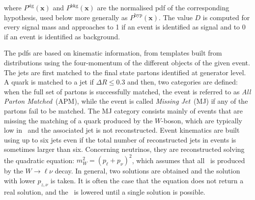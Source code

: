 where $P^{\text{sig}}(\textbf{x})$ and $P^{\text{bkg}}(\textbf{x})$ are the normalised pdf of the corresponding hypothesis, used below more generally as $P^{\text{hyp}}(\textbf{x})$. The value $D$ is computed for every signal mass and approaches to 1 if an event is identified as signal and to 0 if an event is identified as background.

The pdfs are based on kinematic information, from templates built from distributions using the four-momentum of the different objects of the given event. The jets are first matched to the final state partons identified at generator level. A quark is matched to a jet if $\Delta R\leq 0.3$ and then, two categories are defined: when the full set of partons is successfully matched, the event is referred to as \textit{All Parton Matched}~(APM), while the event is called \textit{Missing Jet}~(MJ) if any of the partons fail to be matched. The MJ category consists mainly of events that are missing the matching of a quark produced by the $W$-boson, which are typically low in \pT\ and the associated jet is not reconstructed. Event kinematics are built using up to six jets even if the total number of reconstructed jets in events is sometimes larger than six. %
Concerning neutrinos, they are reconstructed solving the quadratic equation: $m_W^2 = (p_\ell + p_\nu)^2$, which assumes that all \MET\ is produced by the $W\to\ell\nu$ decay. In general, two solutions are obtained and the solution with lower $p_{z,\nu}$ is taken. It is often the case that the equation does not return a real solution, and the \MET\ is lowered until a single solution is possible.

